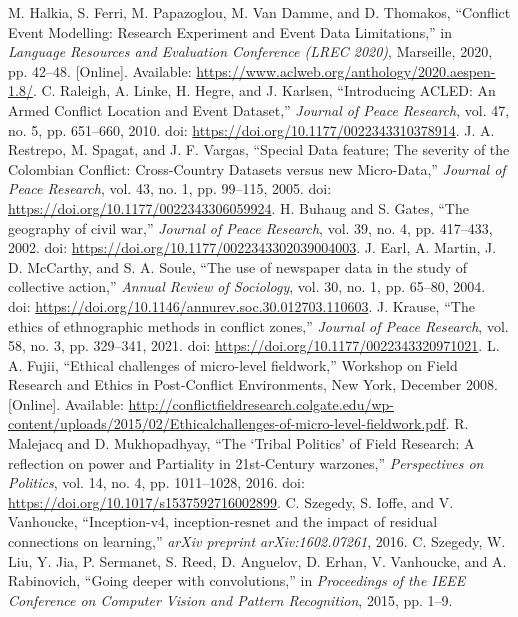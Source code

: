 \documentclass[conference]{IEEEtran}
\begin{document}
\begin{thebibliography}{00}
 M. Halkia, S. Ferri, M. Papazoglou, M. Van Damme, and D. Thomakos, ``Conflict Event Modelling: Research Experiment and Event Data Limitations,'' in \textit{Language Resources and Evaluation Conference (LREC 2020)}, Marseille, 2020, pp. 42--48. [Online]. Available: \url{https://www.aclweb.org/anthology/2020.aespen-1.8/}.
 C. Raleigh, A. Linke, H. Hegre, and J. Karlsen, ``Introducing ACLED: An Armed Conflict Location and Event Dataset,'' \textit{Journal of Peace Research}, vol. 47, no. 5, pp. 651--660, 2010. doi: \url{https://doi.org/10.1177/0022343310378914}.
 J. A. Restrepo, M. Spagat, and J. F. Vargas, ``Special Data feature; The severity of the Colombian Conflict: Cross-Country Datasets versus new Micro-Data,'' \textit{Journal of Peace Research}, vol. 43, no. 1, pp. 99--115, 2005. doi: \url{https://doi.org/10.1177/0022343306059924}.
 H. Buhaug and S. Gates, ``The geography of civil war,'' \textit{Journal of Peace Research}, vol. 39, no. 4, pp. 417--433, 2002. doi: \url{https://doi.org/10.1177/0022343302039004003}.
 J. Earl, A. Martin, J. D. McCarthy, and S. A. Soule, ``The use of newspaper data in the study of collective action,'' \textit{Annual Review of Sociology}, vol. 30, no. 1, pp. 65--80, 2004. doi: \url{https://doi.org/10.1146/annurev.soc.30.012703.110603}.
 J. Krause, ``The ethics of ethnographic methods in conflict zones,'' \textit{Journal of Peace Research}, vol. 58, no. 3, pp. 329--341, 2021. doi: \url{https://doi.org/10.1177/0022343320971021}.
 L. A. Fujii, ``Ethical challenges of micro-level fieldwork,'' Workshop on Field Research and Ethics in Post-Conflict Environments, New York, December 2008. [Online]. Available: \url{http://conflictfieldresearch.colgate.edu/wp-content/uploads/2015/02/Ethicalchallenges-of-micro-level-fieldwork.pdf}.
 R. Malejacq and D. Mukhopadhyay, ``The ‘Tribal Politics’ of Field Research: A reflection on power and Partiality in 21st-Century warzones,'' \textit{Perspectives on Politics}, vol. 14, no. 4, pp. 1011--1028, 2016. doi: \url{https://doi.org/10.1017/s1537592716002899}.
 C. Szegedy, S. Ioffe, and V. Vanhoucke, ``Inception-v4, inception-resnet and the impact of residual connections on learning,'' \textit{arXiv preprint arXiv:1602.07261}, 2016.
 C. Szegedy, W. Liu, Y. Jia, P. Sermanet, S. Reed, D. Anguelov, D. Erhan, V. Vanhoucke, and A. Rabinovich, ``Going deeper with convolutions,'' in \textit{Proceedings of the IEEE Conference on Computer Vision and Pattern Recognition}, 2015, pp. 1--9.

\end{thebibliography}
\end{document}
